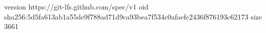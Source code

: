 version https://git-lfs.github.com/spec/v1
oid sha256:5d5fa613ab1a55de9f788ad71d9ca93bea7f534c0afaefc2436f876193c62173
size 3661
